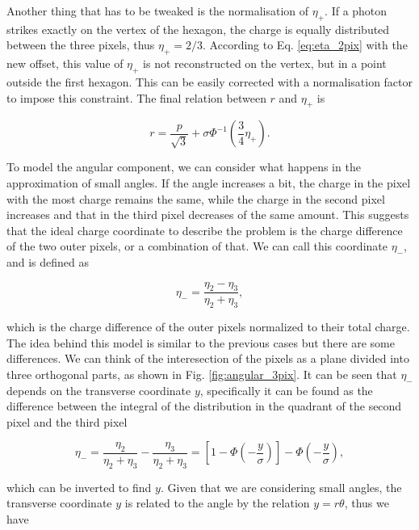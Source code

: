 Another thing that has to be tweaked is the normalisation of $\eta_+$. If a photon strikes exactly on the vertex of the hexagon, the charge is equally distributed between the three pixels, thus $\eta_+ = 2/3$. According to Eq. \ref{eq:eta_2pix} with the new offset, this value of $\eta_+$ is not reconstructed on the vertex, but in a point outside the first hexagon. This can be easily corrected with a normalisation factor to impose this constraint. The final relation between $r$ and $\eta_+$ is

\begin{equation}
r = \frac{p}{\sqrt{3}} + \sigma \Phi^{-1} \left( \frac{3}{4}\eta_+ \right).
\label{eq:eta_3pix}
\end{equation}

To model the angular component, we can consider what happens in the approximation of small angles. If the angle increases a bit, the charge in the pixel with the most charge remains the same, while the charge in the second pixel increases and that in the third pixel decreases of the same amount. This suggests that the ideal charge coordinate to describe the problem is the charge difference of the two outer pixels, or a combination of that. We can call this coordinate $\eta_-$, and is defined as

\begin{equation}
\eta_- = \frac{\eta_2 - \eta_3}{\eta_2 + \eta_3},
\end{equation}

which is the charge difference of the outer pixels normalized to their total charge. The idea behind this model is similar to the previous cases but there are some differences. We can think of the interesection of the pixels as a plane divided into three orthogonal parts, as shown in Fig. \ref{fig:angular_3pix}. It can be seen that $\eta_-$ depends on the transverse coordinate $y$, specifically it can be found as the difference between the integral of the distribution in the quadrant of the second pixel and the third pixel

\begin{equation}
\eta_- = \frac{\eta_2}{\eta_2 + \eta_3} - \frac{\eta_3}{\eta_2 + \eta_3} = \left[1 - \Phi \left( - \frac{y}{\sigma} \right ) \right] - \Phi \left( - \frac{y}{\sigma} \right),
\end{equation}

which can be inverted to find $y$. Given that we are considering small angles, the transverse coordinate $y$ is related to the angle by the relation $y=r\theta$, thus we have

